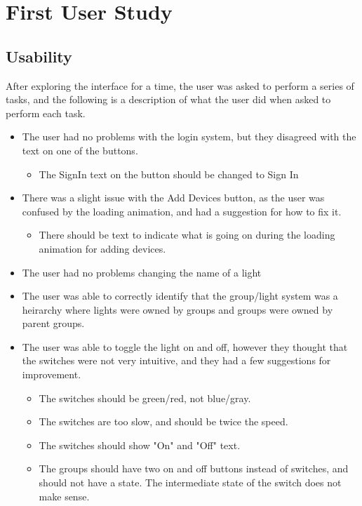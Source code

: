 \documentclass[oneside,openright]{book}
\begin{document}
\section{First User Study}
\subsection{Usability}
After exploring the interface for a time, the user was asked to perform a series of tasks, and the following is a description of what the user did when asked to perform each task.
\begin{itemize}
  \item The user had no problems with the login system, but they disagreed with the text on one of the buttons.
    \begin{itemize}
      \item The SignIn text on the button should be changed to Sign In
    \end{itemize}
  \item There was a slight issue with the Add Devices button, as the user was confused by the loading animation, and had a suggestion for how to fix it.
    \begin{itemize}
      \item There should be text to indicate what is going on during the loading animation for adding devices.
    \end{itemize}
  \item The user had no problems changing the name of a light
  \item The user was able to correctly identify that the group/light system was a heirarchy where lights were owned by groups and groups were owned by parent groups.
  \item The user was able to toggle the light on and off, however they thought that the switches were not very intuitive, and they had a few suggestions for improvement.
    \begin{itemize}
      \item The switches should be green/red, not blue/gray.
      \item The switches are too slow, and should be twice the speed.
      \item The switches should show "On" and "Off" text.
      \item The groups should have two on and off buttons instead of switches, and should not have a state. The intermediate state of the switch does not make sense.
    \end{itemize}

\end{itemize}
\end{document}
